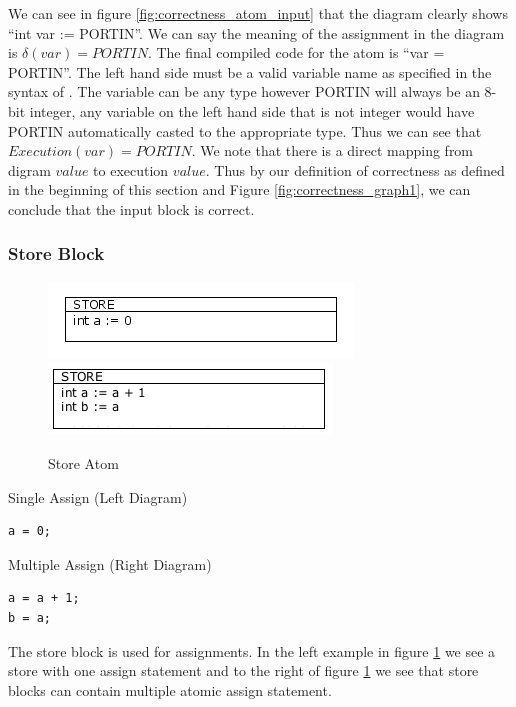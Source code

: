 We can see in figure \ref{fig:correctness_atom_input} that the diagram clearly shows ``int var := PORTIN''. We can say the meaning of the assignment in the diagram is $\delta(var) = PORTIN$. The final compiled code for the atom is ``var = PORTIN''. The left hand side must be a valid variable name as specified in the syntax of \plccharts. The variable can be any type however PORTIN will always be an 8-bit integer, any variable on the left hand side that is not integer would have PORTIN automatically casted to the appropriate type. Thus we can see that $Execution(var) = PORTIN$. We note that there is a direct mapping from digram $value$ to execution $value$. Thus by our definition of correctness as defined in the beginning of this section and Figure \ref{fig:correctness_graph1}, we can conclude that the input block is correct.


\subsubsection{Store Block}

\begin{figure}[h]
	\centering
	\includegraphics[width=\imgmedphoto]{./images/correctness_atom_store_single.png}
	\includegraphics[width=\imgmedphoto]{./images/correctness_atom_store.png}
	\caption{Store Atom}
	\label{fig:correctness_atom_store}
\end{figure}

Single Assign (Left Diagram)
\begin{lstlisting}[frame=single]
a = 0;
\end{lstlisting}

Multiple Assign (Right Diagram)
\begin{lstlisting}[frame=single]
a = a + 1;
b = a;
\end{lstlisting}

The store block is used for assignments. In the left example in figure \ref{fig:correctness_atom_store} we see a store with one assign statement and to the right of figure \ref{fig:correctness_atom_store} we see that store blocks can contain multiple atomic assign statement. 

